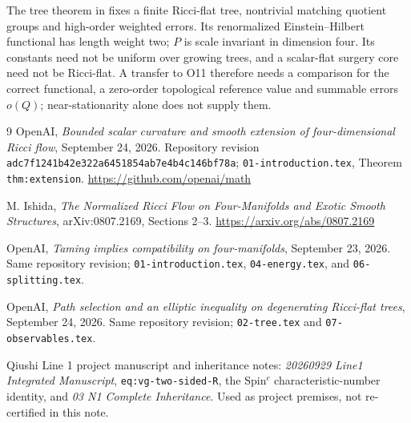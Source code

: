 \documentclass[11pt]{article}
\theoremstyle{remark}\newtheorem{remark}[theorem]{Remark}
\begin{document}
The tree theorem in \cite{OAITree} fixes a finite Ricci-flat tree,
nontrivial matching quotient groups and high-order weighted errors.
Its renormalized Einstein--Hilbert functional has length weight two;
$P$ is scale invariant in dimension four. Its constants need not be
uniform over growing trees, and a scalar-flat surgery core need not be
Ricci-flat. A transfer to O11 therefore needs a comparison for the
correct functional, a zero-order topological reference value and
summable errors $o(Q)$; near-stationarity alone does not supply them.

\begin{thebibliography}{9}
OpenAI, \emph{Bounded scalar curvature and smooth extension of
four-dimensional Ricci flow}, September 24, 2026.
Repository revision \texttt{adc7f1241b42e322a6451854ab7e4b4c146bf78a};
\texttt{01-introduction.tex}, Theorem \texttt{thm:extension}.
\url{https://github.com/openai/math}

M. Ishida, \emph{The Normalized Ricci Flow on Four-Manifolds and
Exotic Smooth Structures}, arXiv:0807.2169, Sections 2--3.
\url{https://arxiv.org/abs/0807.2169}

OpenAI, \emph{Taming implies compatibility on four-manifolds},
September 23, 2026. Same repository revision;
\texttt{01-introduction.tex}, \texttt{04-energy.tex}, and
\texttt{06-splitting.tex}.

OpenAI, \emph{Path selection and an elliptic inequality on degenerating
Ricci-flat trees}, September 24, 2026. Same repository revision;
\texttt{02-tree.tex} and \texttt{07-observables.tex}.

Qiushi Line 1 project manuscript and inheritance notes:
\emph{20260929 Line1 Integrated Manuscript},
\texttt{eq:vg-two-sided-R}, the Spin$^c$ characteristic-number identity,
and \emph{03 N1 Complete Inheritance}. Used as project premises,
not re-certified in this note.
\end{thebibliography}
\end{document}

